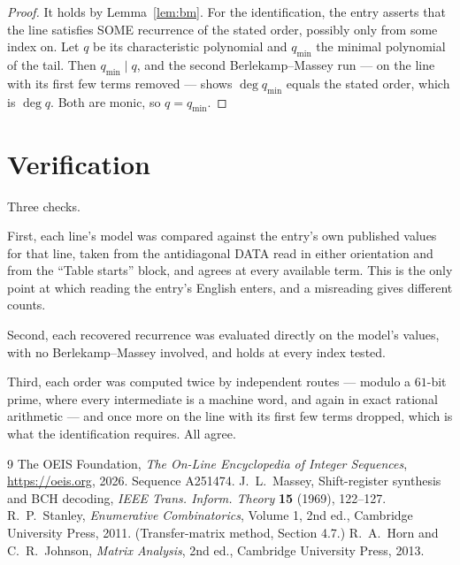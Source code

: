 \documentclass[11pt,a4paper]{article}
\theoremstyle{plain}
\theoremstyle{definition}
\begin{document}
\begin{proof}
It holds by Lemma~\ref{lem:bm}. For the identification, the entry asserts that the line
satisfies SOME recurrence of the stated order, possibly only from some index on. Let $q$ be its
characteristic polynomial and $q_{\min}$ the minimal polynomial of the tail. Then
$q_{\min}\mid q$, and the second Berlekamp--Massey run --- on the line with its first few
terms removed --- shows $\deg q_{\min}$ equals the stated order, which is $\deg q$. Both are
monic, so $q=q_{\min}$.
\end{proof}

\section{Verification}

Three checks.

First, each line's model was compared against the entry's own published values for that line,
taken from the antidiagonal DATA read in either orientation and from the ``Table starts''
block, and agrees at every available term. This is the only point at which reading the entry's
English enters, and a misreading gives different counts.

Second, each recovered recurrence was evaluated directly on the model's values, with no
Berlekamp--Massey involved, and holds at every index tested.

Third, each order was computed twice by independent routes --- modulo a $61$-bit prime, where
every intermediate is a machine word, and again in exact rational arithmetic --- and once more
on the line with its first few terms dropped, which is what the identification requires. All
agree.

\begin{thebibliography}{9}
 The OEIS Foundation, \emph{The On-Line Encyclopedia of Integer
Sequences}, \url{https://oeis.org}, 2026. Sequence A251474.
 J.~L.~Massey, Shift-register synthesis and BCH decoding, \emph{IEEE
Trans. Inform. Theory} \textbf{15} (1969), 122--127.
 R.~P.~Stanley, \emph{Enumerative Combinatorics}, Volume 1, 2nd ed.,
Cambridge University Press, 2011. (Transfer-matrix method, Section 4.7.)
 R.~A.~Horn and C.~R.~Johnson, \emph{Matrix Analysis}, 2nd ed., Cambridge
University Press, 2013.
\end{thebibliography}
\end{document}
